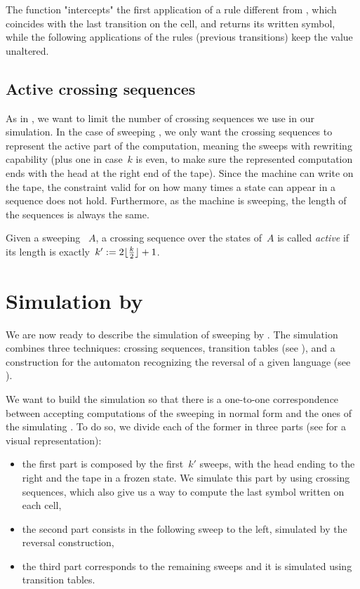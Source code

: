 The function "intercepts" the first application of a rule different from , which coincides with the last transition on the cell, and returns its written symbol, while the following applications of the rules (previous transitions) keep the value unaltered.


\subsection{Active crossing sequences}
As in \TDFAs, we want to limit the number of crossing sequences we use in our simulation.
In the case of sweeping \kDLAs, we only want the crossing sequences to represent the active part of the computation, meaning the sweeps with rewriting capability (plus one in case~$k$ is even, to make sure the represented computation ends with the head at the right end of the tape).
Since the machine can write on the tape, the constraint valid for \TDFAs on how many times a state can appear in a sequence does not hold. Furthermore, as the machine is sweeping, the length of the sequences is always the same.
\begin{defn}
	Given a sweeping \kLA~$A$, a crossing sequence over the states of~$A$ is called \emph{active} if its length is exactly~$k':=2\lfloor \frac{k}{2} \rfloor+1$.
\end{defn}



\section{Simulation by \texorpdfstring{\ONFAs}{1NFAs}}\label{sec:swkdla-to-NFA}
We are now ready to describe the simulation of sweeping \kDLAs by \ONFAs.
The simulation combines three techniques: crossing sequences, transition tables (see ), and a construction for the automaton recognizing the reversal of a given language (see ).

We want to build the simulation so that there is a one-to-one correspondence between accepting computations of the sweeping \kDLA in normal form and the ones of the simulating \ONFA.
To do so, we divide each of the former in three parts (see  for a visual representation):
\begin{itemize}
	\item the first part is composed by the first~$k'$ sweeps, with the head ending to the right and the tape in a frozen state. We simulate this part by using crossing sequences, which also give us a way to compute the last symbol written on each cell,
	\item the second part consists in the following sweep to the left, simulated by the reversal construction,
	\item the third part corresponds to the remaining sweeps and it is simulated using transition tables.
\end{itemize}

